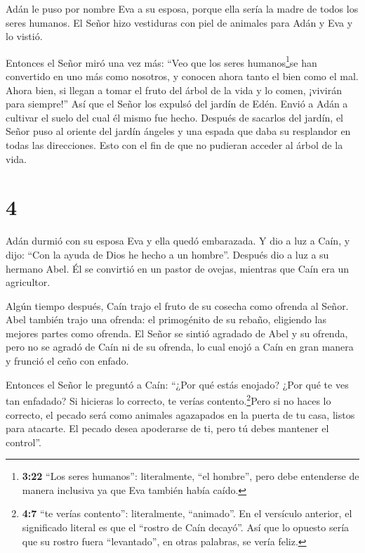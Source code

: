  Adán le puso por nombre Eva a su esposa, porque ella sería
la madre de todos los seres humanos.  El Señor hizo
vestiduras con piel de animales para Adán y Eva y lo vistió.

 Entonces el Señor miró una vez más: ``Veo que los seres
humanos\footnote{\textbf{3:22} ``Los seres humanos'': literalmente, ``el
  hombre'', pero debe entenderse de manera inclusiva ya que Eva también
  había caído.}se han convertido en uno más como nosotros, y conocen
ahora tanto el bien como el mal. Ahora bien, si llegan a tomar el fruto
del árbol de la vida y lo comen, ¡vivirán para siempre!'' 
Así que el Señor los expulsó del jardín de Edén. Envió a Adán a cultivar
el suelo del cual él mismo fue hecho.  Después de sacarlos
del jardín, el Señor puso al oriente del jardín ángeles y una espada que
daba su resplandor en todas las direcciones. Esto con el fin de que no
pudieran acceder al árbol de la vida.

\hypertarget{section-3}{%
\section{4}\label{section-3}}

 Adán durmió con su esposa Eva y ella quedó embarazada. Y
dio a luz a Caín, y dijo: ``Con la ayuda de Dios he hecho a un hombre''.
 Después dio a luz a su hermano Abel. Él se convirtió en un
pastor de ovejas, mientras que Caín era un agricultor.

 Algún tiempo después, Caín trajo el fruto de su cosecha
como ofrenda al Señor.  Abel también trajo una ofrenda: el
primogénito de su rebaño, eligiendo las mejores partes como ofrenda. El
Señor se sintió agradado de Abel y su ofrenda,  pero no se
agradó de Caín ni de su ofrenda, lo cual enojó a Caín en gran manera y
frunció el ceño con enfado.

 Entonces el Señor le preguntó a Caín: ``¿Por qué estás
enojado? ¿Por qué te ves tan enfadado?  Si hicieras lo
correcto, te verías contento.\footnote{\textbf{4:7} ``te verías
  contento'': literalmente, ``animado''. En el versículo anterior, el
  significado literal es que el ``rostro de Caín decayó''. Así que lo
  opuesto sería que su rostro fuera ``levantado'', en otras palabras, se
  vería feliz.}Pero si no haces lo correcto, el pecado será como
animales agazapados en la puerta de tu casa, listos para atacarte. El
pecado desea apoderarse de ti, pero tú debes mantener el control''.

